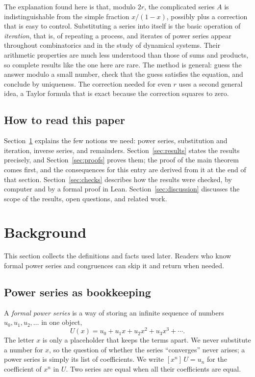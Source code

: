 \documentclass[11pt,a4paper]{article}
\theoremstyle{definition}
\theoremstyle{remark}
\newcommand{\coeff}[2]{[x^{#1}]\,#2}
\begin{document}
The explanation found here is that, modulo $2r$, the complicated series $A$ is indistinguishable from the simple
fraction $x/(1-x)$, possibly plus a correction that is easy to control. Substituting a series into itself is the
basic operation of \emph{iteration}, that is, of repeating a process, and iterates of power series appear throughout
combinatorics and in the study of dynamical systems. Their arithmetic properties are much less understood than those
of sums and products, so complete results like the one here are rare. The method is general: guess the answer modulo
a small number, check that the guess satisfies the equation, and conclude by uniqueness. The correction needed for
even $r$ uses a second general idea, a Taylor formula that is exact because the correction squares to zero.

\subsection{How to read this paper}
Section~\ref{sec:background} explains the few notions we need: power series, substitution and iteration, inverse
series, and remainders. Section~\ref{sec:results} states the results precisely, and Section~\ref{sec:proofs} proves
them; the proof of the main theorem comes first, and the consequences for this entry are derived from it at the end of
that section. Section~\ref{sec:checks} describes how the results were checked, by computer and by a formal proof in
Lean. Section~\ref{sec:discussion} discusses the scope of the results, open questions, and related work.
\section{Background}\label{sec:background}
This section collects the definitions and facts used later. Readers who know formal power series and congruences can skip it and return when needed.
\subsection{Power series as bookkeeping}
A \emph{formal power series} is a way of storing an infinite sequence of numbers $u_0,u_1,u_2,\dots$ in one object,
\[
U(x)=u_0+u_1x+u_2x^2+u_3x^3+\cdots .
\]
The letter $x$ is only a placeholder that keeps the terms apart. We never substitute a number for $x$, so the question
of whether the series ``converges'' never arises; a power series is simply its list of coefficients. We write
$\coeff{n}{U}=u_n$ for the coefficient of $x^n$ in $U$. Two series are equal when all their coefficients are equal.
\end{document}
